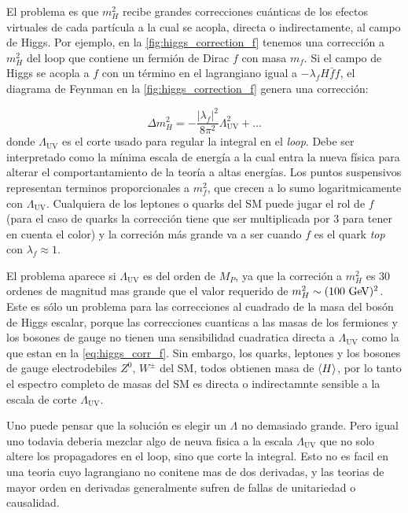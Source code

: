 El problema es que $m_H^2$ recibe grandes correcciones cuánticas de los efectos
virtuales de cada partícula a la cual se acopla, directa o indirectamente, al
campo de Higgs. Por ejemplo, en la \cref{fig:higgs_correction_f} tenemos una
corrección a $m_H^2$ del loop que contiene un fermión de Dirac $f$ con masa
$m_f$. Si el campo de Higgs se acopla a $f$ con un término en el lagrangiano
igual a $-\lambda_f H \bar{f}f$, el diagrama de Feynman en la
\cref{fig:higgs_correction_f} genera una corrección:

\begin{equation}
  \Delta m_H^2 = -\frac{|\lambda_f|^2}{8\pi^2} \Lambda^2_\text{UV} + \ldots
  \label{eq:higgs_corr_f}
\end{equation}
%
donde $\Lambda_\text{UV}$ es el corte usado para regular la integral en el
\emph{loop}.
Debe ser interpretado como la m\'inima escala de energ\'ia a la cual entra
la nueva física para alterar el comportantamiento de la teoría a altas
energías. Los puntos suspensivos representan terminos proporcionales a
$m_f^2$, que crecen a lo sumo logaritmicamente con $\Lambda_\text{UV}$.
Cualquiera de los leptones o quarks del SM puede jugar el rol de $f$ (para
el caso de quarks la correcci\'on tiene que ser multiplicada por 3 para
tener en cuenta el color) y la correci\'on m\'as grande va a ser cuando
$f$ es el quark \emph{top} con $\lambda_f \approx 1$.

El problema aparece si $\Lambda_\text{UV}$ es del orden de $M_P$, ya que
la correci\'on a $m_H^2$ es 30 ordenes de magnitud mas grande que el valor
requerido de $m_H^2 \sim (100 \gev)^2$.
Este es sólo un problema para las correcciones al cuadrado de la masa del
bos\'on de Higgs escalar, porque las correcciones cuanticas a las masas de
los fermiones y los bosones de gauge no tienen una sensibilidad cuadratica
directa a $\Lambda_\text{UV}$ como la que estan en la \cref{eq:higgs_corr_f}.
Sin embargo, los quarks, leptones y los bosones de gauge electrodebiles
$Z^0$, $W^{\pm}$ del SM, todos obtienen masa de $\langle H \rangle$, por lo tanto el
espectro completo de masas del SM es directa o indirectamnte sensible a
la escala de corte $\Lambda_\text{UV}$.

Uno puede pensar que la soluci\'on es elegir un $\Lambda$ no demasiado
grande. Pero igual uno todavia deberia mezclar algo de neuva fisica
a la escala $\Lambda_\text{UV}$ que no solo altere los propagadores en
el loop, sino que corte la integral. Esto no es facil en una teoria cuyo
lagrangiano no conitene mas de dos derivadas, y las teorias de mayor orden
en derivadas generalmente sufren de fallas de unitariedad o causalidad.

